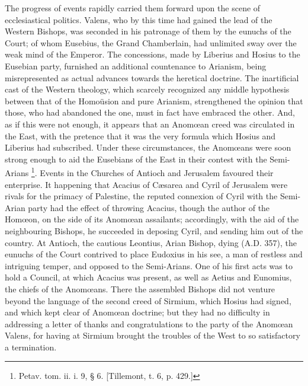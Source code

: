 The progress of events rapidly carried them forward upon the scene
of ecclesiastical politics. Valens, who by this time had gained the
lead of the Western Bishops, was seconded in his patronage of them by
the eunuchs of the Court; of whom Eusebius, the Grand Chamberlain, had
unlimited sway over the weak mind of the Emperor. The concessions,
made by Liberius and Hosius to the Eusebian party, furnished an
additional countenance to Arianism, being misrepresented as actual
advances towards the heretical doctrine. The inartificial cast of the
Western theology, which scarcely recognized any middle hypothesis
between that of the Homoüsion and pure Arianism, strengthened the
opinion that those, who had abandoned the one, must in fact have
embraced the other. And, as if this were not enough, it appears that
an Anomœan creed was circulated in the East, with the pretence that
it was the very formula which Hosius and Liberius had subscribed.
Under these circumstances, the Anomœans were soon strong enough to
aid the Eusebians of the East in their contest with the Semi-Arians \footnote{Petav. tom. ii. i. 9, § 6. [Tillemont, t.
6, p. 429.]}. Events in the Churches of Antioch and Jerusalem favoured their
enterprise. It happening that Acacius of Cæsarea and Cyril of
Jerusalem were rivals for the primacy of Palestine, the reputed
connexion of Cyril with the Semi-Arian party had the effect of
throwing Acacius, though the author of the Homœon, on the side of its
Anomœan assailants; accordingly, with the aid of the neighbouring
Bishops, he succeeded in deposing Cyril, and sending him out of the
country. At Antioch, the cautious Leontius, Arian Bishop, dying (A.D.
357), the eunuchs of the Court contrived to place Eudoxius in his see,
a man of restless and intriguing temper, and opposed to the
Semi-Arians. One of his first acts was to hold a Council, at which
Acacius was present, as well as Aetius and Eunomius, the chiefs of the
Anomœans. There the assembled Bishops did not venture beyond the
language of the second creed of Sirmium, which Hosius had
signed, and which kept clear of Anomœan doctrine; but they had no
difficulty in addressing a letter of thanks and congratulations to the
party of the Anomœan Valens, for having at Sirmium brought the
troubles of the West to so satisfactory a termination.

